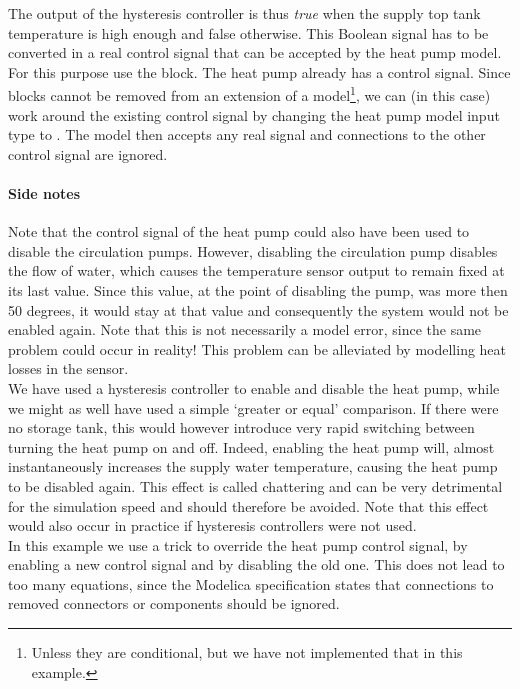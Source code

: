 \documentclass[10pt,a4paper]{article}
\begin{document}
The output of the hysteresis controller is thus \textit{true} when the supply top tank temperature is 
high enough and false otherwise.
This Boolean signal has to be converted in a real control signal that can be
accepted by the heat pump model.
For this purpose use the  block.
The heat pump already has a control signal. 
Since blocks cannot be removed from an extension of a model\footnote{Unless 
they are conditional, but we have not implemented that in this example.},
we can (in this case) work around the existing control signal
by changing the heat pump model input type to .
The model then accepts any real signal and connections to the other control 
signal are ignored. 

\paragraph{Side notes}
Note that the control signal of the heat pump could also have been used to disable
the circulation pumps.
However, disabling the circulation pump disables the flow of water,
which causes the temperature sensor output to remain fixed at
its last value.
Since this value, at the point of disabling the pump, was more then 50 degrees,
it would stay at that value and consequently the system would not be enabled again.
Note that this is not necessarily a model error, since the same problem could
occur in reality! This problem can be alleviated by modelling
heat losses in the sensor.\\

We have used a hysteresis controller to enable and disable the heat pump,
while we might as well have used a simple `greater or equal' comparison.
If there were no storage tank,
this would however introduce very rapid switching between turning the heat pump on
and off. Indeed, enabling the heat pump will, almost instantaneously increases the 
supply water temperature, causing the heat pump to be disabled again.
This effect is called chattering and can be very detrimental for the simulation speed 
and should therefore be avoided.
Note that this effect would also occur in practice if hysteresis controllers were not used.\\

In this example we use a trick to override the heat pump control signal, by enabling a new
control signal and by disabling the old one. This does not lead
to too many equations, since the Modelica specification states that 
connections to removed connectors or components should be ignored.
\end{document}
